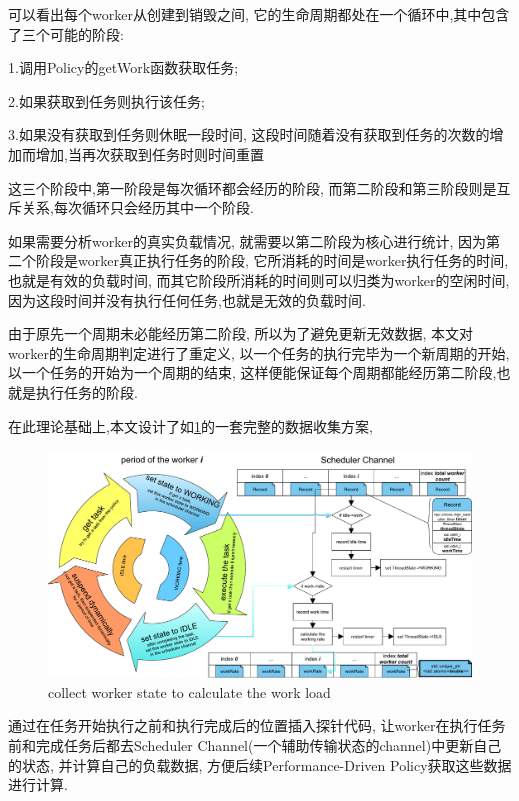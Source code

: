 \documentclass{mproj}
\begin{document}
可以看出每个worker从创建到销毁之间,
它的生命周期都处在一个循环中,其中包含了三个可能的阶段:

1.调用Policy的getWork函数获取任务;

2.如果获取到任务则执行该任务;

3.如果没有获取到任务则休眠一段时间,
这段时间随着没有获取到任务的次数的增加而增加,当再次获取到任务时则时间重置

这三个阶段中,第一阶段是每次循环都会经历的阶段,
而第二阶段和第三阶段则是互斥关系,每次循环只会经历其中一个阶段.

如果需要分析worker的真实负载情况,
就需要以第二阶段为核心进行统计,
因为第二个阶段是worker真正执行任务的阶段,
它所消耗的时间是worker执行任务的时间,也就是有效的负载时间,
而其它阶段所消耗的时间则可以归类为worker的空闲时间,
因为这段时间并没有执行任何任务,也就是无效的负载时间.

由于原先一个周期未必能经历第二阶段,
所以为了避免更新无效数据,
本文对worker的生命周期判定进行了重定义,
以一个任务的执行完毕为一个新周期的开始,
以一个任务的开始为一个周期的结束,
这样便能保证每个周期都能经历第二阶段,也就是执行任务的阶段.

在此理论基础上,本文设计了如\cref{fig:worker_collect_calculate}的一套完整的数据收集方案,

\begin{figure}[h]
    \centering %
    \includegraphics[width=1.0\textwidth]{images/worker_collect_calculate.pdf} %
    \caption{collect worker state to calculate the work load} %
    \label{fig:worker_collect_calculate} %
\end{figure}
\FloatBarrier

通过在任务开始执行之前和执行完成后的位置插入探针代码,
让worker在执行任务前和完成任务后都去Scheduler Channel(一个辅助传输状态的channel)中更新自己的状态,
并计算自己的负载数据,
方便后续Performance-Driven Policy获取这些数据进行计算.
\end{document}
